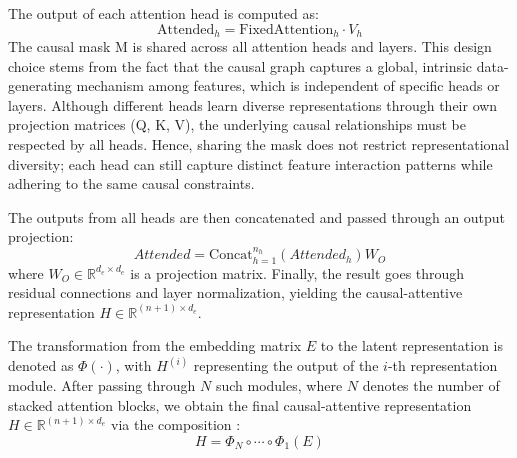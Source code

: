 \documentclass[sigconf, nonacm]{acmart}
\newcommand{\sy}[1]{{\color{black}#1}}
\newcommand{\rlend}[1]{{\color{black}#1}}
\newcommand{\syend}[1]{{\color{black}#1}}
\newcommand{\syadd}[1]{{\color{black}#1}}
\newcommand{\syfix}[1]{{\color{black}#1}}
\begin{document}
The output of each attention head is computed as:
\begin{equation}
    \text{Attended}_h = \text{FixedAttention}_h \cdot V_h
    \label{eq:attended-head}
\end{equation}
\syadd{The causal mask M is shared across all attention heads and layers. This design choice stems from the fact that the causal graph captures a global, intrinsic data-generating mechanism among \syfix{features}, which is independent of specific heads or layers. Although different heads learn diverse representations through their own projection matrices (Q, K, V), the underlying causal relationships must be respected by all heads. Hence, sharing the mask does not restrict representational diversity; each head can still capture distinct feature interaction patterns while adhering to the same causal constraints.}

\rlend{
The outputs from all heads are then concatenated and passed through an output projection: \syadd{
\begin{equation}
    \textit{Attended} = \text{Concat}_{h=1}^{n_h}(\textit{Attended}_h) W_O
    \label{eq:concat-proj}
\end{equation}}
where $W_O \in \mathbb{R}^{d_e \times d_e}$ is a projection matrix. Finally, the result goes through residual connections and layer normalization, yielding the causal-attentive representation $H \in \mathbb{R}^{(n+1) \times d_e}$.
}

\sy{The transformation from the embedding matrix $E$ to the latent representation is denoted as $\Phi(\cdot)$\syend{, with $H^{(i)}$ representing the output of }the $i$-th representation module. After passing through $N$ such modules, \syadd{where $N$ denotes the number of stacked attention blocks,} we obtain the final causal-attentive representation $H \in \mathbb{R}^{(n+1) \times d_e}$ \syend{via the composition}} \syadd{:
\begin{equation}
    H = \Phi_N \circ \cdots \circ \Phi_1(E)
    \label{eq:final-composition}
\end{equation}}
\end{document}
